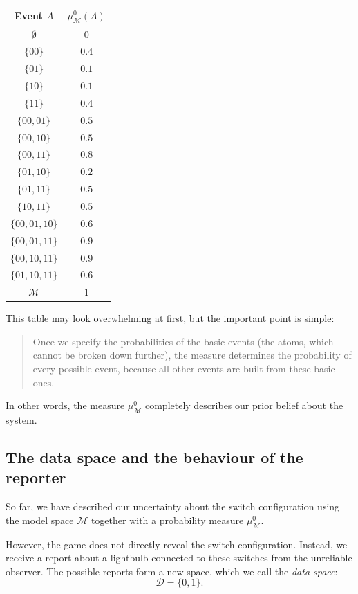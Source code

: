 \documentclass[11pt]{article}
\theoremstyle{remark}
\newcommand{\modelspace}{\mathcal{M}}
\newcommand{\dataspace}{\mathcal{D}}
\begin{document}
\begin{center}
\begin{tabular}{c|c}
Event \(A\) & \(\mu_{\modelspace}^0(A)\) \\
\hline
\(\emptyset\) & \(0\) \\
\(\{00\}\) & \(0.4\) \\
\(\{01\}\) & \(0.1\) \\
\(\{10\}\) & \(0.1\) \\
\(\{11\}\) & \(0.4\) \\
\(\{00,01\}\) & \(0.5\) \\
\(\{00,10\}\) & \(0.5\) \\
\(\{00,11\}\) & \(0.8\) \\
\(\{01,10\}\) & \(0.2\) \\
\(\{01,11\}\) & \(0.5\) \\
\(\{10,11\}\) & \(0.5\) \\
\(\{00,01,10\}\) & \(0.6\) \\
\(\{00,01,11\}\) & \(0.9\) \\
\(\{00,10,11\}\) & \(0.9\) \\
\(\{01,10,11\}\) & \(0.6\) \\
\(\modelspace\) & \(1\)
\end{tabular}
\end{center}

\vspace{2mm}

This table may look overwhelming at first, but the important point is simple:

\begin{quote}
Once we specify the probabilities of the basic events (the atoms, which cannot be broken down further), the measure determines the probability of every possible event, because all other events are built from these basic ones.
\end{quote}

In other words, the measure \(\mu_{\modelspace}^0\) completely describes our prior belief about the system.

\subsection{The data space and the behaviour of the reporter}

So far, we have described our uncertainty about the switch configuration using the model space \(\modelspace\) together with a probability measure \(\mu_{\modelspace}^0\).

However, the game does not directly reveal the switch configuration. Instead, we receive a report about a lightbulb connected to these switches from the unreliable observer. The possible reports form a new space, which we call the \emph{data space}:
\begin{equation}
    \dataspace = \{0,1\}.
\end{equation}
\end{document}
